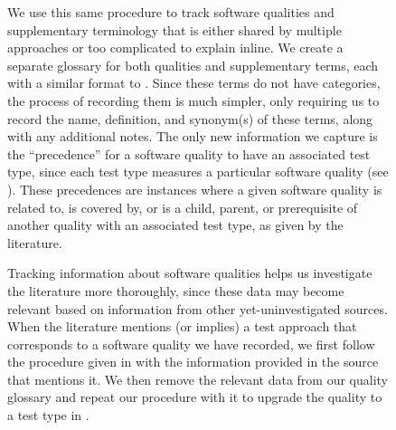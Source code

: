 \begin{figure}[h!]
\label{qual-supp-procedure}
We use this same procedure to track software qualities and supplementary
terminology that is either shared by multiple approaches or too complicated to
explain inline. We create a separate glossary for both qualities and
supplementary terms, each with a similar format to \ourApproachGlossary.
Since these terms do not have categories, the process of recording them is much
simpler, only requiring us to record the name, definition, and synonym(s) of
these terms, along with any additional notes. The only new information
we capture is the ``precedence'' for a software quality to have an associated
test type, since each test type measures a particular software quality (see
). These precedences are instances where a given software
quality is related to, is covered by, or is a child, parent, or prerequisite
of another quality with an associated test type, as given by the literature.

Tracking information about software qualities helps us investigate the
literature more thoroughly, since these data may become relevant based on
information from other yet-uninvestigated sources. When the literature mentions
(or implies) a test approach that corresponds to a software quality we have
recorded, we first follow the procedure given in 
with the information provided in the source that mentions it. We then remove
the relevant data from our quality glossary and repeat our procedure with it
to upgrade the quality to a test type in \ourApproachGlossary{}.



\end{figure}
